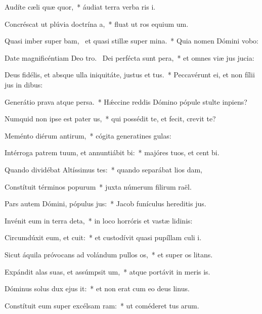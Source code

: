 \item Audíte cæli quæ quor,~* áudiat terra verba ris i.
\item Concréscat ut plúvia doctrína a,~* fluat ut ros equium um.
\item Quasi imber super bam,~\pscross{} et quasi stillæ super mina.~* Quia nomen Dómini vobo:
\item Date magnificéntiam Deo tro.~\pscross{} Dei perfécta sunt pera,~* et omnes viæ jus jucia:
\item Deus fidélis, et absque ulla iniquitáte, justus et tus.~* Peccavérunt ei, et non fílii jus in dibus:
\item Generátio prava atque persa.~* Hǽccine reddis Dómino pópule stulte  inpiens?
\item Numquid non ipse est pater us,~* qui possédit te, et fecit,  crevit te?
\item Meménto diérum antirum,~* cógita generatines gulas:
\item Intérroga patrem tuum, et annuntiábit bi:~* majóres tuos, et cent bi.
\item Quando dividébat Altíssimus tes:~* quando separábat lios dam,
\item Constítuit términos popurum~* juxta númerum filirum raël.
\item Pars autem Dómini, pópulus jus:~* Jacob funículus hereditis jus.
\item Invénit eum in terra deta,~* in loco horróris et vastæ lidinis:
\item Circumdúxit eum, et cuit:~* et custodívit quasi pupíllam culi i.
\item Sicut áquila próvocans ad volándum pullos os,~* et super os litans.
\item Expándit alas suas, et assúmpsit um,~* atque portávit in meris is.
\item Dóminus solus dux ejus it:~* et non erat cum eo deus linus.
\item Constítuit eum super excélsam ram:~* ut coméderet tus arum.
